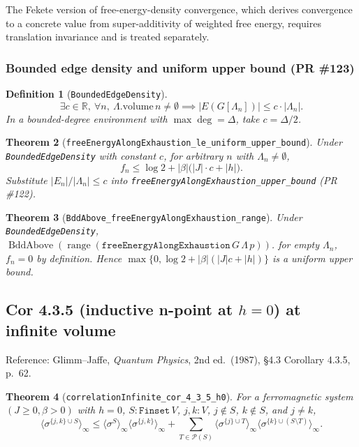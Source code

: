\documentclass[a4paper,11pt]{article}
\newtheorem{theorem}{Theorem}
\newtheorem{definition}[theorem]{Definition}
\begin{document}
The Fekete version of free-energy-density convergence, which derives
convergence to a concrete value from super-additivity of weighted free
energy, requires translation invariance and is treated separately.

\subsubsection{Bounded edge density and uniform upper bound (PR \#123)}

\begin{definition}[\texttt{BoundedEdgeDensity}]
\[
  \exists c \in \mathbb R,\ \forall n,\
    \Lambda.\text{volume}\,n \neq \emptyset \implies
    |E(G[\Lambda_n])| \le c \cdot |\Lambda_n|.
\]
In a bounded-degree environment with $\max\deg = \Delta$, take $c = \Delta/2$.
\end{definition}

\begin{theorem}[\texttt{freeEnergyAlongExhaustion\_le\_uniform\_upper\_bound}]
Under \texttt{BoundedEdgeDensity} with constant $c$, for arbitrary $n$ with
$\Lambda_n \neq \emptyset$,
\[
  f_n \le \log 2 + |\beta| \bigl(|J| \cdot c + |h|\bigr).
\]
Substitute $|E_n|/|\Lambda_n| \le c$ into
\texttt{freeEnergyAlongExhaustion\_upper\_bound} (PR \#122).
\end{theorem}

\begin{theorem}[\texttt{BddAbove\_freeEnergyAlongExhaustion\_range}]
Under \texttt{BoundedEdgeDensity},
$\operatorname{BddAbove}(\operatorname{range}(\texttt{freeEnergyAlongExhaustion}\,G\,\Lambda\,p))$.
for empty $\Lambda_n$, $f_n = 0$ by definition. Hence
$\max\{0, \log 2 + |\beta|(|J|c+|h|)\}$ is a uniform upper bound.
\end{theorem}

\subsection{Cor 4.3.5 (inductive n-point at \texorpdfstring{$h = 0$}{h = 0}) at infinite volume}

Reference: Glimm--Jaffe, \textit{Quantum Physics}, 2nd ed.\ (1987),
\S 4.3 Corollary 4.3.5, p.\ 62.

\begin{theorem}[\texttt{correlationInfinite\_cor\_4\_3\_5\_h0}]
For a ferromagnetic system $(J \ge 0, \beta > 0)$ with $h = 0$,
$S : \texttt{Finset}\,V$, $j, k : V$, $j \notin S$, $k \notin S$, and
$j \ne k$,
\[
\langle \sigma^{\{j, k\} \cup S} \rangle_\infty
  \le \langle \sigma^S \rangle_\infty \langle \sigma^{\{j, k\}} \rangle_\infty
  + \sum_{T \in \mathcal{P}(S)}
    \langle \sigma^{\{j\} \cup T} \rangle_\infty
    \langle \sigma^{\{k\} \cup (S \setminus T)} \rangle_\infty.
\]
\end{theorem}
\end{document}
